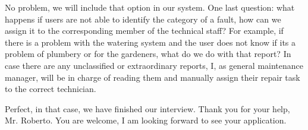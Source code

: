 \ts No problem, we will include that option in our system. One last question: what happens if users are not able to identify the category of a fault, how can we assign it to the corresponding member of the technical staff? For example, if there is a problem with the watering system and the user does not know if its a problem of plumbery or for the gardeners, what do we do with that report?
\rs In case there are any unclassified or extraordinary reports, I, as general maintenance manager, will be in charge of reading them and manually assign their repair task to the correct technician.

\ts Perfect, in that case, we have finished our interview. Thank you for your help, Mr. Roberto.
\rs You are welcome, I am looking forward to see your application.
